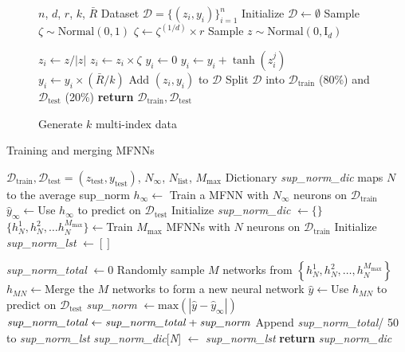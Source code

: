 \clearpage
\begin{figure}[H]
\vspace{-1.5em}
\begin{algorithm}[H] 
\caption{Generate $k$ multi-index data}
\begin{algorithmic}[1] \label{alg:multi_index_data}
\REQUIRE $n$, $d$, $r$, $k$, $\bar{R}$
\ENSURE Dataset $\mathcal{D} = \{(z_i, y_i)\}_{i=1}^n$
\STATE Initialize $\mathcal{D} \gets \emptyset$
    \STATE Sample $\zeta \sim \text{Normal}(0,1)$
    \STATE $\zeta \gets \zeta^{(1/d)} \times r$ \hfill {}
    \STATE Sample $z \sim \text{Normal}\left(0, \text{I}_d \right)$
    
    \STATE $z_i \gets z/ |z|$ \hfill {} 
    \STATE $z_i \gets z_i \times \zeta$ \hfill {}
    \STATE $y_i \gets 0$
        \STATE $y_i \gets y_i + \tanh \left(z_i^j \right)$
    \ENDFOR
\STATE $y_i \gets y_i \times (\bar{R}/k)$
\STATE Add $(z_i, y_i)$ to $\mathcal{D}$
\ENDFOR
\STATE Split $\mathcal{D}$ into $\mathcal{D}_{\text{train}}$ (80\%) and $\mathcal{D}_{\text{test}}$ (20\%)
\STATE \textbf{return} $\mathcal{D}_{\text{train}}, \mathcal{D}_{\text{test}}$
\end{algorithmic}
\end{algorithm}
\end{figure}

\begin{algorithm} 
\caption{Training and merging MFNNs}\label{alg:classification}
\begin{algorithmic}[H]
\REQUIRE $\mathcal{D}_{\text{train}}, \mathcal{D}_{\text{test}} = (z_\text{test}, y_\text{test})$, $N_\infty$, $N_\text{list}$, $M_\text{max}$
\ENSURE Dictionary \textit{sup\_norm\_dic} maps $N$ to the average sup\_norm
\STATE $h_\infty \gets$ Train a MFNN with $N_\infty$ neurons on $\mathcal{D}_{\text{train}}$
\STATE $\hat{y}_\infty \gets$Use $h_\infty$ to predict on $\mathcal{D}_{\text{test}}$
\STATE Initialize \textit{sup\_norm\_dic} $\gets \{\}$
    \STATE  $\{h_N^{1}, h_N^{2}, \dots h^{M_\text{max}}_N \} \gets$Train $M_\text{max}$ MFNNs with $N$ neurons on $\mathcal{D}_{\text{train}}$
    \STATE Initialize \textit{sup\_norm\_lst} $\gets []$

        \STATE \textit{sup\_norm\_total} $\gets 0$
            \STATE Randomly sample $M$ networks from $\left \{ h_N^1, h_N^2, \dots, h^{M_\text{max}}_N \right \}$
            \STATE $h_{MN} \gets$Merge the $M$ networks to form a new neural network 
            \STATE $\hat{y} \gets$Use $h_{MN}$ to predict on $\mathcal{D}_{\text{test}}$
            \STATE \textit{sup\_norm} $\gets \text{max}\left(|\hat{y} - \hat{y}_\infty |\right)$
            \STATE $\text{\textit{sup\_norm\_total}} \gets \text{\textit{sup\_norm\_total}} + \text{\textit{sup\_norm}}$
        \ENDFOR
        \STATE Append \textit{sup\_norm\_total}/ 50 to \textit{sup\_norm\_lst}
    \ENDFOR
    \STATE \textit{sup\_norm\_dic}[\textit{N}] $\gets$ \textit{sup\_norm\_lst}
\ENDFOR
\STATE \textbf{return} \textit{sup\_norm\_dic}
\end{algorithmic}
\end{algorithm}


